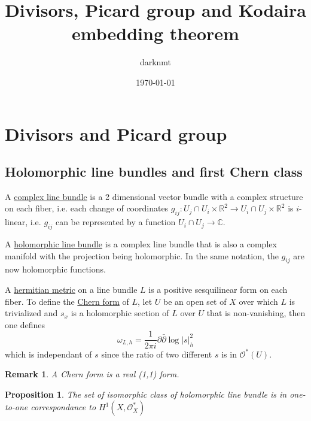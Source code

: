 \documentclass[11pt]{article}
\author{darknmt}
\date{\today}
\title{Divisors, Picard group and Kodaira embedding theorem}
\newtheorem{remark}{Remark}
\newtheorem{proposition}{Proposition}[theorem]
\begin{document}
\maketitle
\tableofcontents

\section{Divisors and Picard group}
\label{sec:org6ca8ed8}

\subsection{Holomorphic line bundles and first Chern class}
\label{sec:org7268523}

A \uline{complex line bundle} is a 2 dimensional vector bundle with a complex structure on each
fiber, i.e. each change of coordinates \(g_{ij}: U_j\cap U_i \times \mathbb{R}^2
\longrightarrow  U_i\cap U_j\times\mathbb{R}^2\) is \(i\)-linear, i.e. \(g_{ij}\) can
be represented by a function \(U_{i}\cap U_j \longrightarrow \mathbb{C}\). 

A \uline{holomorphic line bundle} is a complex line bundle that is also a complex manifold with
the projection being holomorphic. In the same notation, the \(g_{ij}\) are now
holomorphic functions.

A \uline{hermitian metric} on a line bundle \(L\) is a positive sesquilinear form on each
fiber. To define the \uline{Chern form} of \(L\), let \(U\) be an open set of \(X\) over
which \(L\) is trivialized and \(s_x\) is a holomorphic section of \(L\) over \(U\) that is
non-vanishing, then one defines
\[
\omega_{L,h} = \frac{1}{2\pi i}\partial \bar \partial \log |s|_h^2
\]
which is independant of \(s\) since the ratio of two different \(s\) is in \(\mathcal{O}^*(U)\).

\begin{remark}
A Chern form is a real (1,1) form.
\end{remark}


\begin{proposition}
The set of isomorphic class of holomorphic line bundle is in one-to-one correspondance to \(H^1(X,\mathcal{O}_X^*)\)
\end{proposition}
\end{document}
